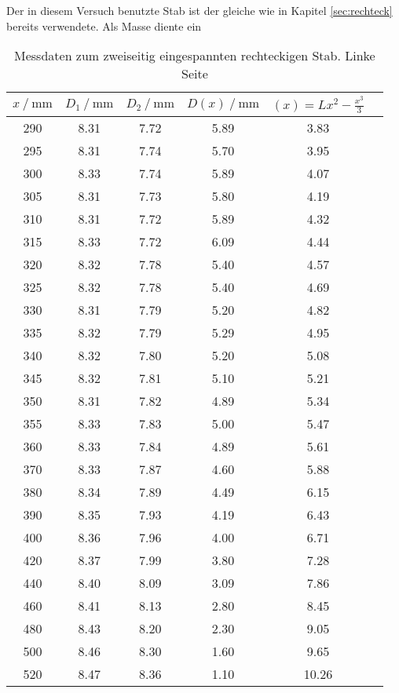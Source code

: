 Der in diesem Versuch benutzte Stab ist der gleiche wie in Kapitel \ref{sec:rechteck} bereits verwendete.
Als Masse diente ein \num{} 

\begin{table}
  \centering
  \caption{Messdaten zum zweiseitig eingespannten rechteckigen Stab. Linke Seite}
  \label{tab:zweiwerte}
  \begin{tabular}{c c c c c c}
    \toprule
      $x\:/\:\si{\milli\meter}$ & $D_1\:/\:\si{\milli\meter}$ & $D_2\:/\:\si{\milli\meter}$ & $D(x)\:/\:\si{\milli\meter}$ & $(x)=Lx^2-\frac{x^3}{3}$ \\
    \midrule
      290 & 8.31 & 7.72  & 5.89 & 3.83 \\
      295 & 8.31 & 7.74  & 5.70 & 3.95 \\
      300 & 8.33 & 7.74  & 5.89 & 4.07 \\
      305 & 8.31 & 7.73  & 5.80 & 4.19 \\
      310 & 8.31 & 7.72  & 5.89 & 4.32 \\
      315 & 8.33 & 7.72  & 6.09 & 4.44 \\
      320 & 8.32 & 7.78  & 5.40 & 4.57 \\
      325 & 8.32 & 7.78  & 5.40 & 4.69 \\
      330 & 8.31 & 7.79  & 5.20 & 4.82 \\
      335 & 8.32 & 7.79  & 5.29 & 4.95 \\
      340 & 8.32 & 7.80  & 5.20 & 5.08 \\
      345 & 8.32 & 7.81  & 5.10 & 5.21 \\
      350 & 8.31 & 7.82  & 4.89 & 5.34 \\
      355 & 8.33 & 7.83  & 5.00 & 5.47 \\
      360 & 8.33 & 7.84  & 4.89 & 5.61 \\
      370 & 8.33 & 7.87  & 4.60 & 5.88 \\
      380 & 8.34 & 7.89  & 4.49 & 6.15 \\
      390 & 8.35 & 7.93  & 4.19 & 6.43 \\
      400 & 8.36 & 7.96  & 4.00 & 6.71 \\
      420 & 8.37 & 7.99  & 3.80 & 7.28 \\
      440 & 8.40 & 8.09  & 3.09 & 7.86 \\
      460 & 8.41 & 8.13  & 2.80 & 8.45 \\
      480 & 8.43 & 8.20  & 2.30 & 9.05 \\
      500 & 8.46 & 8.30  & 1.60 & 9.65 \\
      520 & 8.47 & 8.36  & 1.10 & 10.26 \\
    \bottomrule
  \end{tabular}
\end{table}

